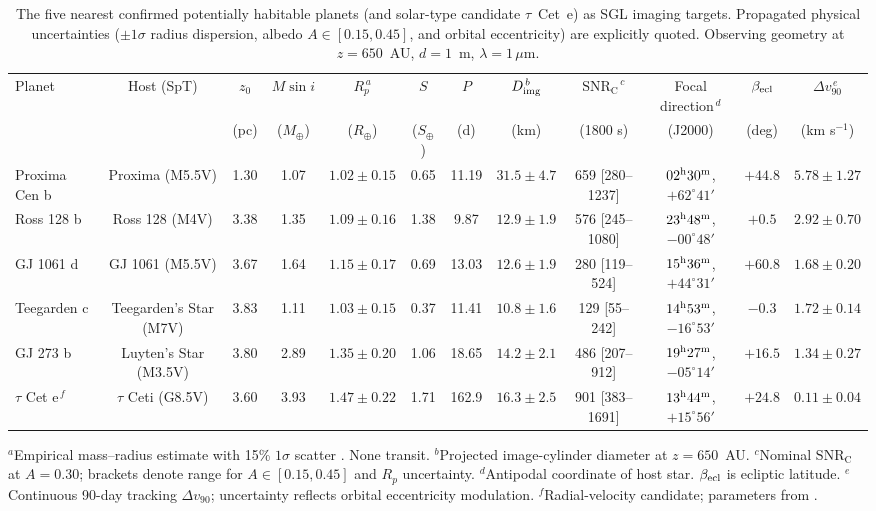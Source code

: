 \documentclass[twocolumn,10pt]{article}
\begin{document}
\begin{table}[t]
\centering
\caption{The five nearest confirmed potentially habitable planets (and
solar-type candidate $\tau$~Cet~e) as SGL imaging targets. Propagated physical
uncertainties ($\pm1\sigma$ radius dispersion, albedo $A\in[0.15,0.45]$, and orbital eccentricity)
are explicitly quoted. Observing geometry at $z=650$~AU, $d=1$~m, $\lambda=1\,\mu$m.}
\label{tab:targets}
\footnotesize
\setlength{\tabcolsep}{2.2pt}
\begin{tabular}{lccccccccccc}
\toprule
Planet & Host (SpT) & $z_0$ & $M\sin i$ & $R_p^{\,a}$ & $S$ & $P$ &
$D_{\rm img}^{\,b}$ & $\mathrm{SNR_C}^{\,c}$ & Focal direction$^{\,d}$ &
$\beta_{\rm ecl}$ & $\Delta v_{90}^{\,e}$ \\
 & & (pc) & ($M_\oplus$) & ($R_\oplus$) & ($S_\oplus$) & (d) & (km) &
(1800 s) & (J2000) & (deg) & (km s$^{-1}$) \\
\midrule
Proxima Cen b & Proxima (M5.5V) & 1.30 & 1.07 & $1.02\pm0.15$ & 0.65 & 11.19 &
$31.5\pm4.7$ & 659 [280--1237] & $02^{\rm h}30^{\rm m}$, $+62^\circ41'$ & $+44.8$ & $5.78\pm1.27$ \\
Ross 128 b & Ross 128 (M4V) & 3.38 & 1.35 & $1.09\pm0.16$ & 1.38 & 9.87 &
$12.9\pm1.9$ & 576 [245--1080] & $23^{\rm h}48^{\rm m}$, $-00^\circ48'$ & $+0.5$ & $2.92\pm0.70$ \\
GJ 1061 d & GJ 1061 (M5.5V) & 3.67 & 1.64 & $1.15\pm0.17$ & 0.69 & 13.03 &
$12.6\pm1.9$ & 280 [119--524] & $15^{\rm h}36^{\rm m}$, $+44^\circ31'$ & $+60.8$ & $1.68\pm0.20$ \\
Teegarden c & Teegarden's Star (M7V) & 3.83 & 1.11 & $1.03\pm0.15$ & 0.37 & 11.41 &
$10.8\pm1.6$ & 129 [55--242] & $14^{\rm h}53^{\rm m}$, $-16^\circ53'$ & $-0.3$ & $1.72\pm0.14$ \\
GJ 273 b & Luyten's Star (M3.5V) & 3.80 & 2.89 & $1.35\pm0.20$ & 1.06 & 18.65 &
$14.2\pm2.1$ & 486 [207--912] & $19^{\rm h}27^{\rm m}$, $-05^\circ14'$ & $+16.5$ & $1.34\pm0.27$ \\
\midrule
$\tau$ Cet e$^{\,f}$ & $\tau$ Ceti (G8.5V) & 3.60 & 3.93 & $1.47\pm0.22$ &
1.71 & 162.9 & $16.3\pm2.5$ & 901 [383--1691] & $13^{\rm h}44^{\rm m}$, $+15^\circ56'$ &
$+24.8$ & $0.11\pm0.04$ \\
\bottomrule
\end{tabular}

\vspace{1.5mm}
\parbox{0.96\textwidth}{\footnotesize
$^{a}$Empirical mass--radius estimate with 15\% $1\sigma$ scatter \citep{chenkipping17}. None transit.
$^{b}$Projected image-cylinder diameter at $z=650$~AU.
$^{c}$Nominal $\mathrm{SNR_C}$ at $A=0.30$; brackets denote range for $A\in[0.15,0.45]$ and $R_p$ uncertainty.
$^{d}$Antipodal coordinate of host star. $\beta_{\rm ecl}$ is ecliptic latitude.
$^{e}$Continuous 90-day tracking $\Delta v_{90}$; uncertainty reflects orbital eccentricity modulation.
$^{f}$Radial-velocity candidate; parameters from \citet{anglada16,bonfils18,dreizler20,dreizler24,astudillo17,feng17}.}
\end{table}
\end{document}

